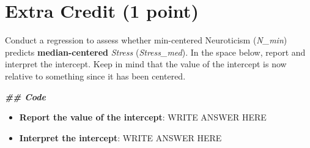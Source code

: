 \documentclass[
]{article}
\newenvironment{Shaded}{\begin{snugshade}}{\end{snugshade}}
\newcommand{\DocumentationTok}[1]{\textcolor[rgb]{0.56,0.35,0.01}{\textbf{\textit{#1}}}}
\begin{document}
\hypertarget{extra-credit-1-point}{%
\section{\texorpdfstring{Extra Credit \textbf{(1
point)}}{Extra Credit (1 point)}}\label{extra-credit-1-point}}

Conduct a regression to assess whether min-centered Neuroticism
(\emph{N\_min}) predicts \textbf{median-centered} \emph{Stress}
(\emph{Stress\_med}). In the space below, report and interpret the
intercept. Keep in mind that the value of the intercept is now relative
to something since it has been centered.

\begin{Shaded}
\begin{Highlighting}[]
\DocumentationTok{\#\# Code}
\end{Highlighting}
\end{Shaded}

\begin{itemize}
\item
  \textbf{Report the value of the intercept}: WRITE ANSWER HERE
\item
  \textbf{Interpret the intercept}: WRITE ANSWER HERE
\end{itemize}
\end{document}
